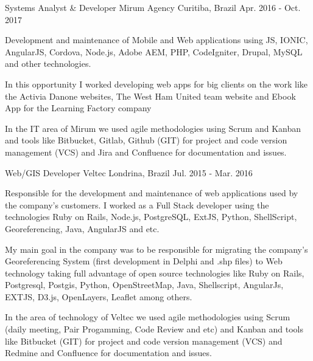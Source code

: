 \begin{cventries}
  \cventry
    { Systems Analyst \& Developer} %
    {Mirum Agency} %
    {Curitiba, Brazil} %
    {Apr. 2016 - Oct. 2017} %
    {
      \begin{cvitems} %
        \item {Development and maintenance of Mobile and Web applications using JS, IONIC, AngularJS, Cordova, Node.js, Adobe AEM, PHP, CodeIgniter, Drupal, MySQL and other technologies.}
        \item {In this opportunity I worked developing web apps for big clients on the work like the Activia Danone websites, The West Ham United team website and Ebook App for the Learning Factory company }
\item {In the IT area of Mirum we used agile methodologies using Scrum and Kanban and tools like Bitbucket, Gitlab, Github (GIT) for project and code version management (VCS) and Jira and Confluence for documentation and issues.}
\end{cvitems}
    }

  \cventry
    {Web/GIS Developer} %
    {Veltec} %
    {Londrina, Brazil} %
    {Jul. 2015 - Mar. 2016} %
    {
      \begin{cvitems} %
        \item {
Responsible for the development and maintenance of web applications used by the company's customers.
I worked as a Full Stack developer using the technologies Ruby on Rails, Node.js, PostgreSQL, ExtJS, Python, ShellScript, Georeferencing, Java, AngularJS and etc.}
\item {My main goal in the company was to be responsible for migrating the company's Georeferencing System (first development in Delphi and .shp files) to Web technology taking full advantage of open source technologies like Ruby on Rails, Postgresql, Postgis, Python, OpenStreetMap, Java, Shellscript, AngularJs, EXTJS, D3.js, OpenLayers, Leaflet among others.}
\item {In the area of technology of Veltec we used agile methodologies using Scrum (daily meeting, Pair Progamming, Code Review and etc) and Kanban and tools like Bitbucket (GIT) for project and code version management (VCS) and Redmine and Confluence for documentation and issues.}
      \end{cvitems}
    }


\end{cventries}
